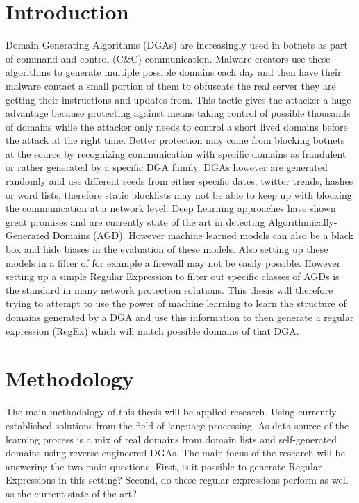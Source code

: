 \documentclass[a4paper, 12pt]{article}
\begin{document}
\section{Introduction}
Domain Generating Algorithms (DGAs) are increasingly used in botnets as part of
command and control (C\&C) communication. Malware creators use these algorithms
to generate multiple possible domains each day and then have their malware
contact a small portion of them to obfuscate the real server they are getting
their instructions and updates from. This tactic gives the attacker a huge
advantage because protecting against means taking control of possible thousands
of domains while the attacker only needs to control a short lived domains
before the attack at the right time. Better protection may come from blocking
botnets at the source by recognizing communication with specific domains as
fraudulent or rather generated by a specific DGA family. DGAs however are
generated randomly and use different seeds from either specific dates, twitter
trends, hashes or word lists, therefore static blocklists may not be able to
keep up with blocking the communication at a network level. Deep Learning
approaches have shown great promises and are currently state of the art in
detecting Algorithmically-Generated Domains (AGD). 
However machine learned models can also be a black box and hide biases in the evaluation 
of these models. Also setting up these models in a filter of for example a firewall may
not be easily possible. However setting up a simple Regular Expression to filter out specific classes of AGDs
is the standard in many network protection solutions.
This thesis will therefore trying to attempt to use the power of machine learning to learn the structure
of domains generated by a DGA and use this information to then generate a regular expression (RegEx) 
which will match possible domains of that DGA. 


\section{Methodology}
The main methodology of this thesis will be applied research. Using currently established solutions
from the field of language processing. As data source of the learning process is a mix of real domains
from domain lists and self-generated domains using reverse engineered DGAs. \cite{baderj_dga}
The main focus of the research will be answering the two main questions. First, is it possible to
generate Regular Expressions in this setting? Second, do these regular expressions perform as well
as the current state of the art?
\end{document}

